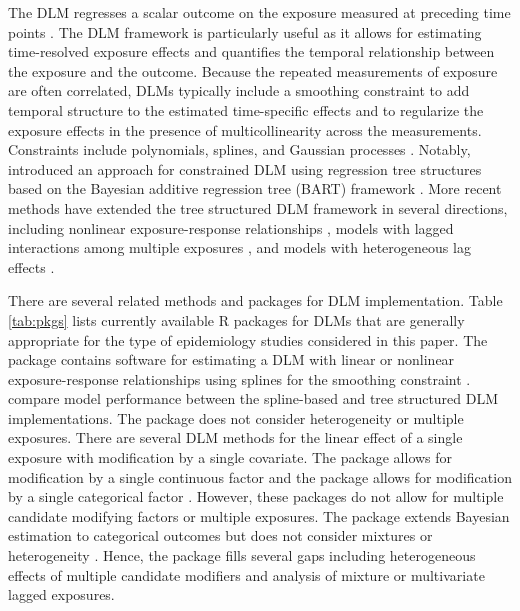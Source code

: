 The DLM regresses a scalar outcome on the exposure measured at preceding time points \citep{schwartz_distributed_2000, gasparrini_distributed_2010}. The DLM framework is particularly useful as it allows for estimating time-resolved exposure effects and quantifies the temporal relationship between the exposure and the outcome. Because the repeated measurements of exposure are often correlated, DLMs typically include a smoothing constraint to add temporal structure to the estimated time-specific effects and to regularize the exposure effects in the presence of multicollinearity across the measurements. Constraints include polynomials, splines, and Gaussian processes \citep{zanobetti_generalized_2000, warren_spatial-temporal_2012}. Notably, \cite{mork_estimating_2023} introduced an approach for constrained DLM using regression tree structures based on the Bayesian additive regression tree (BART) framework \citep{chipman2010}. More recent methods have extended the tree structured DLM framework in several directions, including nonlinear exposure-response relationships \citep{mork_treed_2022}, models with lagged interactions among multiple exposures \citep{mork_estimating_2023}, and models with heterogeneous lag effects \citep{mork_heterogeneous_2023}.

There are several related methods and packages for DLM implementation. Table \ref{tab:pkgs} lists currently available R packages for DLMs that are generally appropriate for the type of epidemiology studies considered in this paper. The  package contains software for estimating a DLM with linear or nonlinear exposure-response relationships using splines for the smoothing constraint \citep{gasparrini_dlnm_2013}. \cite{mork_treed_2022, mork_estimating_2023} compare model performance between the spline-based and tree structured DLM implementations. The  package does not consider heterogeneity or multiple exposures. There are several DLM methods for the linear effect of a single exposure with modification by a single covariate. The  package allows for modification by a single continuous factor \citep{demateis_penalized_2024} and the  package allows for modification by a single categorical factor \citep{wilson_bayesian_2017}.  However, these packages do not allow for multiple candidate modifying factors or multiple exposures. The package  extends Bayesian estimation to categorical outcomes but does not consider mixtures or heterogeneity \citep{dempsey2025bayesianvariableselectiondistributed}. Hence, the  package fills several gaps including heterogeneous effects of multiple candidate modifiers and analysis of mixture or multivariate lagged exposures.

